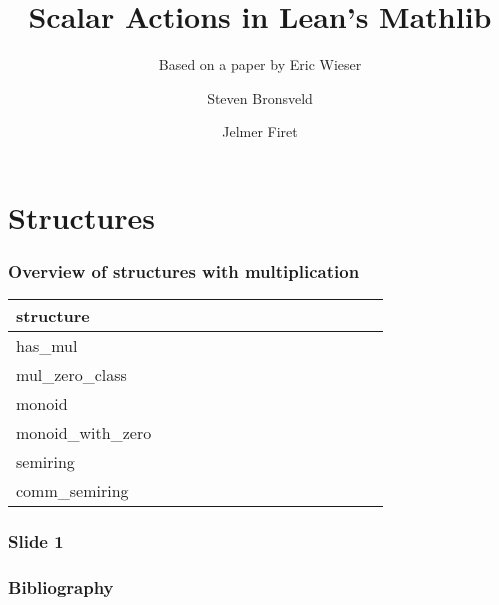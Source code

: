 \documentclass{beamer}
\author{Steven Bronsveld \and Jelmer Firet}
\title[Scalar Actions]{Scalar Actions in Lean's Mathlib}
\subtitle{Based on a paper by Eric Wieser\cite{wieserScalarActionsLean2021}}
\institute[Radboud University Nijmegen]{Radboud University Nijmegen}
\newcommand{\yes}{\checkmark}
\newcommand{\no}{}
\begin{document}
	\begin{frame}[t]
	\titlepage
	\end{frame}

	\section*{Structures} %
	\label{sec:structures}
	\begin{frame}
		\frametitle{Overview of structures with multiplication}
		\begin{tabular}{l*{14}{@{}c}}
			structure & 
				 &
				 &
				 &
				 &
				 &
				 &
				 &
				 &
				 &
				 &
				 &
				&
				\\
			\hline
			has\_mul			&\no	&\no	&\yes	&\no	&\no	&\no	&\no	&\no	&\no	&\no	&\no	&\no	&\no	\\
			mul\_zero\_class	&\yes	&\no	&\yes	&\yes	&\no	&\no	&\no	&\no	&\no	&\no	&\no	&\no	&\no	\\
			monoid				&\no	&\yes	&\yes	&\no	&\yes	&\yes	&\no	&\no	&\no	&\no	&\no	&\no	&\no	\\
			monoid\_with\_zero	&\yes	&\yes	&\yes	&\yes	&\yes	&\yes	&\no	&\no	&\no	&\no	&\no	&\no	&\no	\\
			semiring			&\yes	&\yes	&\yes	&\yes	&\yes	&\yes	&\no	&\yes	&\yes	&\yes	&\yes	&\yes	&\yes	\\
			comm\_semiring		&\yes	&\yes	&\yes	&\yes	&\yes	&\yes	&\yes	&\yes	&\yes	&\yes	&\yes	&\yes	&\yes	\\
		\end{tabular}
	\end{frame}
	
	\begin{frame}[t]
	\frametitle{Slide 1}
		
	\end{frame}


	\begin{frame}[t]
	\frametitle{Bibliography}
		\printbibliography
	\end{frame}
\end{document}
